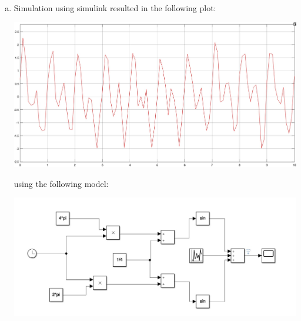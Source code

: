 \documentclass[12pt]{article}
\begin{document}
\begin{enumerate}[a)]

	
	\item Simulation using simulink resulted in the following plot:\\
        \begin{centering}
        \includegraphics[scale = 0.14]{figures/noise_sim}\\
        \end{centering}

        using the following model:\\
        \begin{centering}
        \includegraphics[scale = 0.3]{figures/simulink_1bc}\\
        \end{centering}
	

\end{enumerate}
\end{document}
